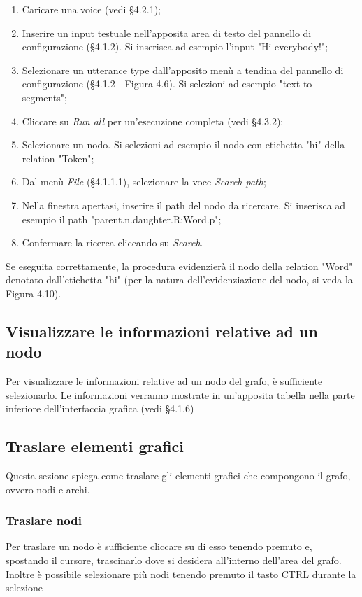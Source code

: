 \documentclass[openany,12pt,a4paper]{report}
\begin{document}
	\begin{enumerate}
		\item Caricare una voice (vedi §4.2.1);
		\item Inserire un input testuale nell'apposita area di testo del pannello di configurazione (§4.1.2). Si inserisca ad esempio l'input "Hi everybody!";
		\item Selezionare un utterance type dall'apposito menù a tendina del pannello di configurazione (§4.1.2 - Figura 4.6). Si selezioni ad esempio "text-to-segments";
		\item Cliccare su \textit{Run all} per un'esecuzione completa (vedi §4.3.2);
		\item Selezionare un nodo. Si selezioni ad esempio il nodo con etichetta "hi" della relation "Token";
		\item Dal menù \textit{File} (§4.1.1.1), selezionare la voce \textit{Search path};
		\item Nella finestra apertasi, inserire il path del nodo da ricercare. Si inserisca ad esempio il path "parent.n.daughter.R:Word.p";
		\item Confermare la ricerca cliccando su \textit{Search}.
	\end{enumerate}
	
	\noindent Se eseguita correttamente, la procedura evidenzierà il nodo della relation "Word" denotato dall'etichetta "hi" (per la natura dell'evidenziazione del nodo, si veda la Figura 4.10).

	\subsection{Visualizzare le informazioni relative ad un nodo}
	Per visualizzare le informazioni relative ad un nodo del grafo, è sufficiente selezionarlo. Le informazioni verranno mostrate in un'apposita tabella nella parte inferiore dell'interfaccia grafica (vedi §4.1.6)

	\subsection{Traslare elementi grafici}
	Questa sezione spiega come traslare gli elementi grafici che compongono il grafo, ovvero nodi e archi.
	
	\subsubsection{Traslare nodi}
	Per traslare un nodo è sufficiente cliccare su di esso tenendo premuto e, spostando il cursore, trascinarlo dove si desidera all'interno dell'area del grafo.
	Inoltre è possibile selezionare più nodi tenendo premuto il tasto CTRL durante la selezione
	
\end{document}
